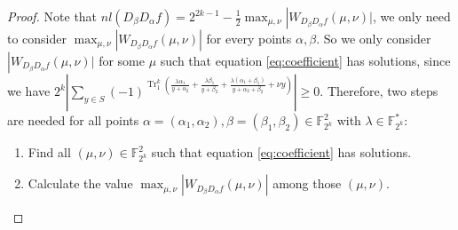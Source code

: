 \documentclass{article}
\newcommand{\F}{\mathbb{F}}
\newcommand{\0}{\textbf{0}}
\newcommand{\1}{\textbf{1}}
\newcommand{\TRACE}{\operatorname{Tr}_1^k}
\theoremstyle{plain}
\theoremstyle{nonumberplain}
\begin{document}
\begin{proof}
    Note that  $ nl(D_{\beta}D_{\alpha}f)=2^{2k-1}-\frac{1}{2}\max_{\mu,\nu}\left\lvert W_{D_{\beta}D_{\alpha}f}(\mu,\nu)\rvert\right. $, 
    we only need to consider $ \max_{\mu,\nu}|W_{D_{\beta}D_{\alpha}f}(\mu,\nu)| $ for every points $ \alpha,\beta $. 
    So we only consider $ \left\lvert W_{D_{\beta}D_{\alpha}f}(\mu,\nu)\rvert\right. $ 
    for some $ \mu $ such that equation \eqref{eq:coefficient} has solutions, since we have 
    $ 2^k\left\lvert \sum_{y\in S}(-1)^{\TRACE\left(\frac{\lambda\alpha_1}{y+\alpha_2}+\frac{\lambda\beta_1}{y+\beta_2}+\frac{\lambda(\alpha_1+\beta_1)}{y+\alpha_2+\beta_2}+\nu y\right)}\right\rvert \ge 0 $.
    Therefore, two steps are needed for all points 
    $ \alpha=(\alpha_1,\alpha_2),\beta=(\beta_1,\beta_2)\in\F_{2^k}^2 $ with $ \lambda\in\F_{2^k}^* $:  
    \begin{enumerate}[label=\roman{*})]
        \item Find all $ (\mu,\nu)\in\F_{2^k}^2 $ such that equation \eqref{eq:coefficient}
        has solutions.
        \item Calculate the value $ \max_{\mu,\nu}|W_{D_{\beta}D_{\alpha}f}(\mu,\nu)| $ among those $ (\mu,\nu) $.
    \end{enumerate} 
    

\end{proof}
\end{document}
